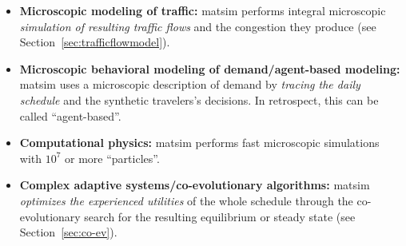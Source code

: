 \begin{itemize}\styleItemize
%
\item \textbf{Microscopic modeling of traffic:} \gls{matsim} performs integral microscopic \emph{simulation of resulting traffic flows} and the congestion they produce (see Section~\ref{sec:trafficflowmodel}).
%
\item \textbf{Microscopic behavioral modeling of demand/agent-based modeling:}
  \gls{matsim} uses a microscopic description of demand by \emph{tracing the daily schedule} and the synthetic travelers's decisions.  In retrospect, this can be called ``agent-based''.
%
\item \textbf{Computational physics:}
\gls{matsim} performs fast microscopic simulations with $10^7$ or more ``particles''.
%
\item  \textbf{Complex adaptive systems/co-evolutionary algorithms:}
\gls{matsim} \emph{optimizes the experienced utilities} of the whole schedule through the co-evolutionary search for the resulting equilibrium or steady state (see Section~\ref{sec:co-ev}). 
%

\end{itemize}




